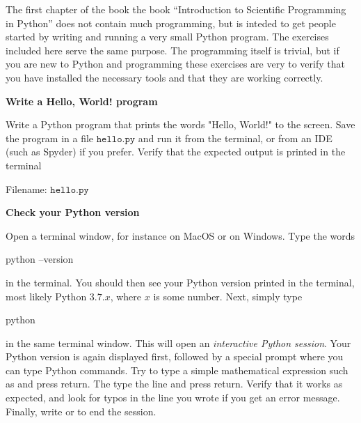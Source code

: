 The first chapter of the book the book ``Introduction to Scientific Programming in Python''
does not contain much programming, but is inteded to get people started by writing
and running a very small Python program. The exercises included here serve the same
purpose. The programming itself is trivial, but if you are new to Python and programming
these exercises are very to verify that you have installed the necessary tools
and that they are working correctly.

\begin{Problem}{\textbf{Write a Hello, World! program}} \label{hello}

\noindent Write a Python program that prints the words "Hello, World!" to the
screen. Save the program in a file $\texttt{hello.py}$ and run it from
the terminal, or from an IDE (such as Spyder) if you prefer. Verify that the
expected output is printed in the terminal

Filename: $\texttt{hello.py}$
\end{Problem}

\begin{Problem}{\textbf{Check your Python version}} \label{version}

\noindent Open a terminal window, for instance  on MacOS or
 on Windows. Type the words
\begin{python}
python --version
\end{python}
in the terminal. You should then see your Python version printed in the terminal,
most likely Python $3.7.x$, where $x$ is some number. Next, simply type
\begin{python}
python
\end{python}
in the same terminal window. This will open an \emph{interactive Python session}.
Your Python version is again displayed first, followed by a special prompt where
you can type Python commands. Try to type a simple mathematical expression such as
 and press return. The type the line  and press
return. Verify that it works as expected, and look for typos in the line you wrote if
you get an error message. Finally, write  or  to end the session.
\end{Problem}
